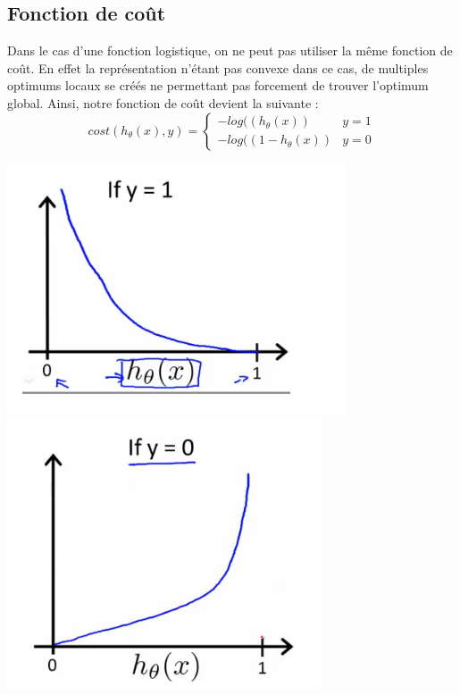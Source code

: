 \documentclass{article}
\theoremstyle{definition}
\begin{document}
\subsection{Fonction de coût}
Dans le cas d'une fonction logistique, on ne peut pas utiliser la même fonction de coût. En effet la représentation n'étant pas convexe dans ce cas, de multiples optimums locaux se créés ne permettant pas forcement de trouver l'optimum global. Ainsi, notre fonction de coût devient la suivante :
\[ cost(h_\theta(x),y) = \begin{cases} 
          -log((h_\theta(x)) & y=1 \\
          -log((1-h_\theta(x)) & y=0
       \end{cases}
\]
\begin{center}
\includegraphics{logistic_cost_1}
\includegraphics{logistic_cost_2}
\end{center}
\end{document}
